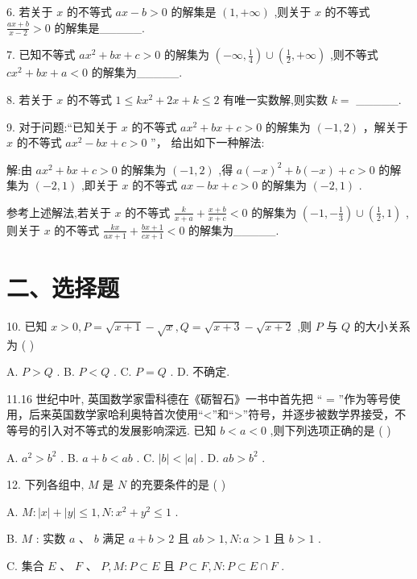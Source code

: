 6. 若关于 $x$ 的不等式 ${ax} - b > 0$ 的解集是 $\left( {1, + \infty }\right)$ ,则关于 $x$ 的不等式 $\frac{{ax} + b}{x - 2} > 0$ 的解集是\_\_\_\_\_.

7. 已知不等式 $a{x}^{2} + {bx} + c > 0$ 的解集为 $\left( {-\infty ,\frac{1}{4}}\right)  \cup  \left( {\frac{1}{2}, + \infty }\right)$ ,则不等式 $c{x}^{2} + {bx} + a < 0$ 的解集为\_\_\_\_\_.

8. 若关于 $x$ 的不等式 $1 \leq  k{x}^{2} + {2x} + k \leq  2$ 有唯一实数解,则实数 $k =$ \_\_\_\_\_.

9. 对于问题:“已知关于 $x$ 的不等式 $a{x}^{2} + {bx} + c > 0$ 的解集为 $\left( {-1,2}\right)$ ，解关于 $x$ 的不等式 $a{x}^{2} - {bx} + c > 0$ ”， 给出如下一种解法:

解:由 $a{x}^{2} + {bx} + c > 0$ 的解集为 $\left( {-1,2}\right)$ ,得 $a{\left( -x\right) }^{2} + b\left( {-x}\right)  + c > 0$ 的解集为 $\left( {-2,1}\right)$ ,即关于 $x$ 的不等式 ${ax} - {bx} + c > 0$ 的解集为 $\left( {-2,1}\right)$ .

参考上述解法,若关于 $x$ 的不等式 $\frac{k}{x + a} + \frac{x + b}{x + c} < 0$ 的解集为 $\left( {-1, - \frac{1}{3}}\right)  \cup  \left( {\frac{1}{2},1}\right)$ ,则关于 $x$ 的不等式 $\frac{kx}{{ax} + 1} + \frac{{bx} + 1}{{cx} + 1} < 0$ 的解集为\_\_\_\_\_.

\section*{二、选择题}

10. 已知 $x > 0,P = \sqrt{x + 1} - \sqrt{x},Q = \sqrt{x + 3} - \sqrt{x + 2}$ ,则 $P$ 与 $Q$ 的大小关系为 ( )

A. $P > Q$ . B. $P < Q$ . C. $P = Q$ . D. 不确定.

11.16 世纪中叶, 英国数学家雷科德在《砺智石》一书中首先把 “ = ”作为等号使用，后来英国数学家哈利奥特首次使用“<”和“>”符号，并逐步被数学界接受，不等号的引入对不等式的发展影响深远. 已知 $b < a < 0$ ,则下列选项正确的是 ( )

A. ${a}^{2} > {b}^{2}$ . B. $a + b < {ab}$ . C. $\left| b\right|  < \left| a\right|$ . D. ${ab} > {b}^{2}$ .

12. 下列各组中, $M$ 是 $N$ 的充要条件的是 ( )

A. $M : \left| x\right|  + \left| y\right|  \leq  1,N : {x}^{2} + {y}^{2} \leq  1$ .

B. $M$ : 实数 $a$ 、 $b$ 满足 $a + b > 2$ 且 ${ab} > 1,N : a > 1$ 且 $b > 1$ .

C. 集合 $E\text{ 、 }F\text{ 、 }P,M : P \subset  E$ 且 $P \subset  F,N : P \subset  E \cap  F$ .

